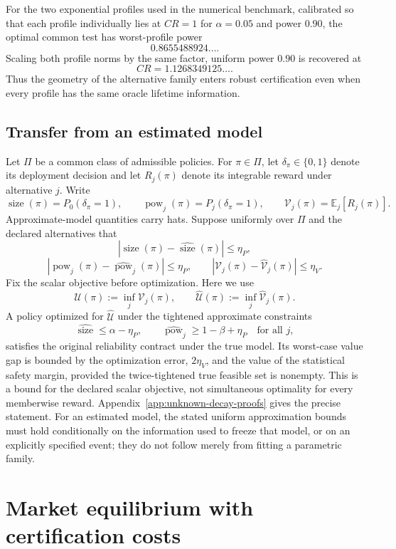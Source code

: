\documentclass[11pt]{article}
\numberwithin{equation}{section}
\theoremstyle{plain}
\theoremstyle{definition}
\theoremstyle{remark}
\begin{document}
For the two exponential profiles used in the numerical benchmark, calibrated so that each profile individually lies at $CR=1$ for $\alpha=0.05$ and power $0.90$, the optimal common test has worst-profile power
\[
0.8655488924\ldots.
\]
Scaling both profile norms by the same factor, uniform power $0.90$ is recovered at
\[
CR=1.1268349125\ldots.
\]
Thus the geometry of the alternative family enters robust certification even when every profile has the same oracle lifetime information.

\subsection{Transfer from an estimated model}\label{estimated-model-transfer}

Let $\Pi$ be a common class of admissible policies. For $\pi\in\Pi$, let $\delta_\pi\in\{0,1\}$ denote its deployment decision and let $R_j(\pi)$ denote its integrable reward under alternative $j$. Write
\[
\operatorname{size}(\pi)=P_0(\delta_\pi=1),
\qquad
\operatorname{pow}_j(\pi)=P_j(\delta_\pi=1),
\qquad
\mathcal V_j(\pi)=\mathbb E_j[R_j(\pi)].
\]
Approximate-model quantities carry hats.  Suppose uniformly over $\Pi$ and the declared alternatives that
\[
|\operatorname{size}(\pi)-\widehat{\operatorname{size}}(\pi)|\le\eta_P,
\]
\[
|\operatorname{pow}_j(\pi)-\widehat{\operatorname{pow}}_j(\pi)|\le\eta_P,
\qquad
|\mathcal V_j(\pi)-\widehat{\mathcal V}_j(\pi)|\le\eta_V.
\]
Fix the scalar objective before optimization. Here we use
\[
\mathcal U(\pi):=\inf_j\mathcal V_j(\pi),
\qquad
\widehat{\mathcal U}(\pi):=\inf_j\widehat{\mathcal V}_j(\pi).
\]
A policy optimized for $\widehat{\mathcal U}$ under the tightened approximate constraints
\[
\widehat{\operatorname{size}}\le\alpha-\eta_P,
\qquad
\widehat{\operatorname{pow}}_j\ge1-\beta+\eta_P
\quad\text{for all }j,
\]
satisfies the original reliability contract under the true model. Its worst-case value gap is bounded by the optimization error, $2\eta_V$, and the value of the statistical safety margin, provided the twice-tightened true feasible set is nonempty. This is a bound for the declared scalar objective, not simultaneous optimality for every memberwise reward. Appendix~\ref{app:unknown-decay-proofs} gives the precise statement. For an estimated model, the stated uniform approximation bounds must hold conditionally on the information used to freeze that model, or on an explicitly specified event; they do not follow merely from fitting a parametric family.

\section{Market equilibrium with certification costs}\label{certification-constrained-market-equilibrium}
\end{document}
